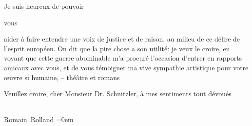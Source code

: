 \pstart
           \begin{otherlanguage}{french}Je suis heureux de pouvoir\end{otherlanguage}{ }\introOben{}\begin{otherlanguage}{french}vous\end{otherlanguage}\introOben{}{ }\begin{otherlanguage}{french}aider à faire entendre une voix
                  de justice et de raison, au milieu de ce délire de l’esprit européen. On dit que la pire chose a son utilité: je veux le
                  croire, en voyant que cette guerre abominable m’a procuré l’occasion d’entrer en
                  rapports amicaux avec {\pb}vous, et de
                  vous témoigner ma vive sympathie artistique pour votre œuvre si humaine, – théâtre
                  et romans\end{otherlanguage}\pend
           
\pstart
           \begin{otherlanguage}{french}Veuillez croire, cher Monsieur Dr. Schnitzler, à mes
                  sentiments tout dévoués\end{otherlanguage}{\\[\baselineskip]}\spacefill\mbox{Romain Rolland}\pend
           \leftskip=0em{}\endnumbering{}
\begin{anhang}
\end{anhang}\newcommand{\dateiname}{L03882}\newcommand{\titel}{Romain Rolland an Arthur Schnitzler, 19. 12. 1914}\newcommand{\editorInnen}{Selma Jahnke und Martin Anton Müller}
